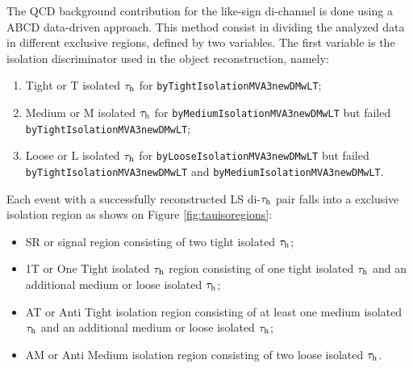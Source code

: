 
The QCD background contribution for the like-sign di-\hadtau channel is done using a ABCD data-driven approach. This method consist in  dividing the analyzed data in different exclusive regions, defined by two variables. The first variable is the \hadtau isolation discriminator used in the object reconstruction, namely:
 	
 	
 	\begin{enumerate}
 		\item Tight or T isolated $\tau_{\text{h}}$ for \texttt{byTight\-IsolationMVA3newDMwLT};
 		\item Medium or M isolated $\tau_{\text{h}}$ for \texttt{byMedium\-IsolationMVA3newDMwLT} but failed \texttt{byTight\-IsolationMVA3newDMwLT};
 		\item Loose or L isolated $\tau_{\text{h}}$  for \texttt{byLoose\-IsolationMVA3newDMwLT} but failed \texttt{byTight\-IsolationMVA3newDMwLT} and \texttt{byMedium\-IsolationMVA3newDMwLT}.
 	\end{enumerate}
 	
Each event with a successfully reconstructed LS di-$\tau_{\text{h}}$ pair falls into a exclusive isolation region as shows on Figure \ref{fig:tauisoregions}:
 	
 	\begin{itemize}
 		\item SR or signal region consisting of two tight isolated $\tau_{\text{h}}$;
 		\item 1T or One Tight isolated $\tau_{\text{h}}$ region consisting of one tight isolated $\tau_{\text{h}}$ and an additional medium or loose isolated $\tau_{\text{h}}$;
 		\item AT or Anti Tight isolation region consisting of at least one medium isolated $\tau_{\text{h}}$ and an additional medium or loose isolated $\tau_{\text{h}}$;
 		\item AM or Anti Medium isolation region consisting of two loose isolated $\tau_{\text{h}}$.
 	\end{itemize}
 
